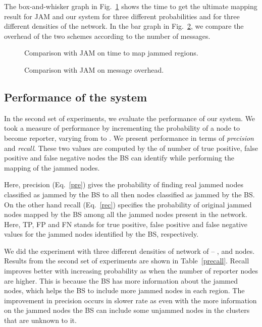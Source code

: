 \documentclass[conference]{IEEEtran}
\begin{document}
The box-and-whisker graph in Fig.~\ref{fig:comp_time} shows the time to get the ultimate mapping result for JAM and our system for three different probabilities and for three different densities of the network.
In the bar graph in Fig.~\ref{fig:comp_msg}, we compare the overhead of the two schemes according to the number of messages.

\begin{figure}
  \begin{center}
  \end{center}
  \caption{Comparison with JAM on time to map jammed regions.}
  \label{fig:comp_time}
\end{figure}

\begin{figure}
  \begin{center}
  \end{center}
  \caption{Comparison with JAM on message overhead.}
  \label{fig:comp_msg}
\end{figure}



\subsection{Performance of the system}

In the second set of experiments, we evaluate the performance of our system. We took a measure of performance by incrementing the probability of a node to become reporter, varying  from  to . We present performance in terms of \emph{precision} and \emph{recall}. These two values are computed by the of number of true positive, false positive and false negative nodes the BS can identify while performing the mapping of the jammed nodes. 

Here, precision (Eq.~\ref{pre}) gives the probability of finding real jammed nodes classified as jammed by the BS to all then nodes classified as jammed by the BS. On the other hand recall (Eq.~\ref{rec}) specifies the probability of original jammed nodes mapped by the BS among all the jammed nodes present in the network. Here, TP, FP and FN stands for true positive, false positive and false negative values for the jammed nodes identified by the BS, respectively.

 

 

We did the experiment with three different densities of network of -- ,  and  nodes. Results from the second set of experiments are shown in Table~\ref{precall}. Recall improves better with increasing probability as when the number of reporter nodes are higher. This is because the BS has more information about the jammed nodes, which helps the BS to include more jammed nodes in each region. The improvement in precision occurs in slower rate as even with the more information on the jammed nodes the BS can include some unjammed nodes in the clusters that are unknown to it.
\end{document}
